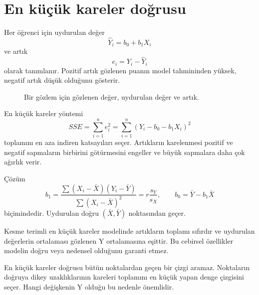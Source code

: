 \section{En küçük kareler doğrusu}

Her öğrenci için uydurulan değer
\[
\hat Y_i=b_0+b_1X_i
\]
ve artık
\[
e_i=Y_i-\hat Y_i
\]
olarak tanımlanır. Pozitif artık gözlenen puanın model tahmininden yüksek,
negatif artık düşük olduğunu gösterir.

\begin{figure}[htbp]
\centering
{}
\caption{Bir gözlem için gözlenen değer, uydurulan değer ve artık.}
\end{figure}

En küçük kareler yöntemi
\[
SSE=\sum_{i=1}^ne_i^2
=\sum_{i=1}^n(Y_i-b_0-b_1X_i)^2
\]
toplamını en aza indiren katsayıları seçer. Artıkların karelenmesi pozitif ve
negatif sapmaların birbirini götürmesini engeller ve büyük sapmalara daha çok
ağırlık verir.

Çözüm
\[
b_1=\frac{\sum(X_i-\bar X)(Y_i-\bar Y)}
{\sum(X_i-\bar X)^2}
=r\frac{s_Y}{s_X},
\qquad
b_0=\bar Y-b_1\bar X
\]
biçimindedir. Uydurulan doğru $(\bar X,\bar Y)$ noktasından geçer.

Kesme terimli en küçük kareler modelinde artıkların toplamı sıfırdır ve
uydurulan değerlerin ortalaması gözlenen Y ortalamasına eşittir. Bu cebirsel
özellikler modelin doğru veya nedensel olduğunu garanti etmez.

\begin{sezgibox}
En küçük kareler doğrusu bütün noktalardan geçen bir çizgi aramaz. Noktaların
doğruya dikey uzaklıklarının kareleri toplamını en küçük yapan denge çizgisini
seçer. Hangi değişkenin Y olduğu bu nedenle önemlidir.
\end{sezgibox}

